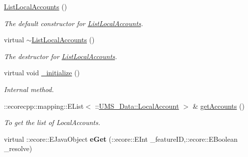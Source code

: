 \begin{DoxyCompactItemize}
\item 
\hypertarget{classUMS__Data_1_1ListLocalAccounts_a5fc7dd47b528b040eb04ec5d1e972129}{
\hyperlink{classUMS__Data_1_1ListLocalAccounts_a5fc7dd47b528b040eb04ec5d1e972129}{ListLocalAccounts} ()}
\label{classUMS__Data_1_1ListLocalAccounts_a5fc7dd47b528b040eb04ec5d1e972129}

\begin{DoxyCompactList}\small\item\em The default constructor for \hyperlink{classUMS__Data_1_1ListLocalAccounts}{ListLocalAccounts}. \item\end{DoxyCompactList}\item 
\hypertarget{classUMS__Data_1_1ListLocalAccounts_a35931bec159c93292d35274e8614470b}{
virtual \hyperlink{classUMS__Data_1_1ListLocalAccounts_a35931bec159c93292d35274e8614470b}{$\sim$ListLocalAccounts} ()}
\label{classUMS__Data_1_1ListLocalAccounts_a35931bec159c93292d35274e8614470b}

\begin{DoxyCompactList}\small\item\em The destructor for \hyperlink{classUMS__Data_1_1ListLocalAccounts}{ListLocalAccounts}. \item\end{DoxyCompactList}\item 
\hypertarget{classUMS__Data_1_1ListLocalAccounts_afa36ccdc019b04891b6034ecc49a49bb}{
virtual void \hyperlink{classUMS__Data_1_1ListLocalAccounts_afa36ccdc019b04891b6034ecc49a49bb}{\_\-initialize} ()}
\label{classUMS__Data_1_1ListLocalAccounts_afa36ccdc019b04891b6034ecc49a49bb}

\begin{DoxyCompactList}\small\item\em Internal method. \item\end{DoxyCompactList}\item 
::ecorecpp::mapping::EList$<$ ::\hyperlink{classUMS__Data_1_1LocalAccount}{UMS\_\-Data::LocalAccount} $>$ \& \hyperlink{classUMS__Data_1_1ListLocalAccounts_af251cc8f7be608b49de2ed9fea4964fa}{getAccounts} ()
\begin{DoxyCompactList}\small\item\em To get the list of LocalAccounts. \item\end{DoxyCompactList}\item 
\hypertarget{classUMS__Data_1_1ListLocalAccounts_af45bd1bb708d6623103a3dbf0ebecbab}{
virtual ::ecore::EJavaObject {\bfseries eGet} (::ecore::EInt \_\-featureID,::ecore::EBoolean \_\-resolve)}
\label{classUMS__Data_1_1ListLocalAccounts_af45bd1bb708d6623103a3dbf0ebecbab}


\end{DoxyCompactItemize}
